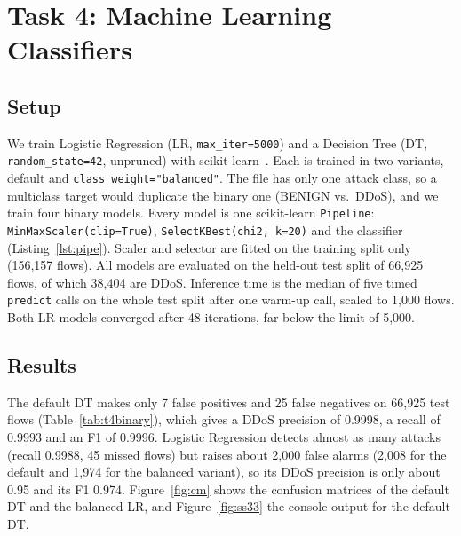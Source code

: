 \chapter{Task 4: Machine Learning Classifiers}\label{chap:task4_ml}

\section{Setup}\label{sec:ml-setup}

We train Logistic Regression (LR, \texttt{max\_iter=5000}) and a Decision Tree (DT, \texttt{random\_state=42}, unpruned) with scikit-learn~\cite{pedregosa2011sklearn}. Each is trained in two variants, default and \texttt{class\_weight="balanced"}. The file has only one attack class, so a multiclass target would duplicate the binary one (BENIGN vs.\ DDoS), and we train four binary models. Every model is one scikit-learn \texttt{Pipeline}: \texttt{MinMaxScaler(clip=True)}, \texttt{SelectKBest(chi2, k=20)} and the classifier (Listing~\ref{lst:pipe}). Scaler and selector are fitted on the training split only (156,157 flows). All models are evaluated on the held-out test split of 66,925 flows, of which 38,404 are DDoS. Inference time is the median of five timed \texttt{predict} calls on the whole test split after one warm-up call, scaled to 1,000 flows. Both LR models converged after 48 iterations, far below the limit of 5,000.



\section{Results}\label{sec:ml-binary}

The default DT makes only 7 false positives and 25 false negatives on 66,925 test flows (Table~\ref{tab:t4binary}), which gives a DDoS precision of 0.9998, a recall of 0.9993 and an F1 of 0.9996. Logistic Regression detects almost as many attacks (recall 0.9988, 45 missed flows) but raises about 2,000 false alarms (2,008 for the default and 1,974 for the balanced variant), so its DDoS precision is only about 0.95 and its F1 0.974. Figure~\ref{fig:cm} shows the confusion matrices of the default DT and the balanced LR, and Figure~\ref{fig:ss33} the console output for the default DT.

